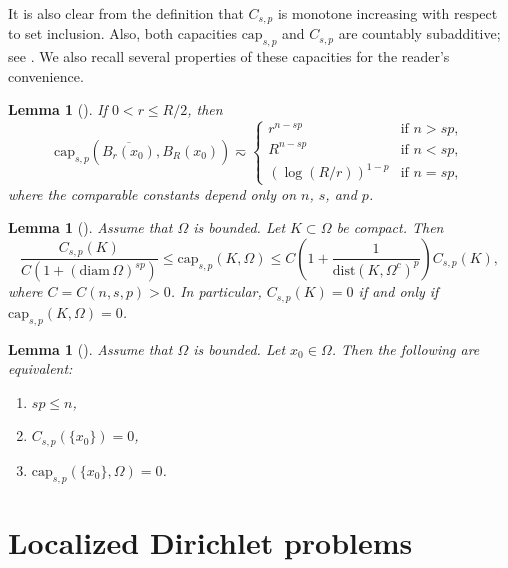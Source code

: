 \documentclass[11pt]{amsart}
\theoremstyle{plain}
\newtheorem{lemma}[theorem]{Lemma}
\theoremstyle{definition}
\numberwithin{equation}{section}
\begin{document}
It is also clear from the definition that $C_{s, p}$ is monotone increasing with respect to set inclusion. Also, both capacities $\mathrm{cap}_{s,p}$ and $C_{s,p}$ are countably subadditive; see \cite[Proposition~3.7]{BBK25}. We also recall several properties of these capacities for the reader's convenience.









\begin{lemma}[{\cite[Lemma~2.17]{KLL23}}]\label{lem-cap}
If $0<r \leq R/2$, then
\begin{equation*}
\mathrm{cap}_{s,p}(\overline{B_r(x_0)}, B_R(x_0)) \eqsim 
\begin{cases}
r^{n-sp}  &\text{if } n>sp, \\
R^{n-sp} &\text{if } n<sp, \\
(\log(R/r))^{1-p}  &\text{if } n=sp,
\end{cases}
\end{equation*}
where the comparable constants depend only on $n$, $s$, and $p$.
\end{lemma}



\begin{lemma}[{\cite[Proposition~5.4]{BBK24}}]
Assume that $\Omega$ is bounded. Let $K \subset \Omega$ be compact. Then
\begin{equation*}
\frac{C_{s, p}(K)}{C(1+(\mathrm{diam}\,\Omega)^{sp})} \leq \mathrm{cap}_{s, p}(K, \Omega) \leq C \left( 1 + \frac{1}{\mathrm{dist}(K, \Omega^c)^p} \right) C_{s, p}(K),
\end{equation*}
where $C=C(n, s, p)>0$. In particular, $C_{s, p}(K)=0$ if and only if $\mathrm{cap}_{s, p}(K, \Omega)=0$.
\end{lemma}


\begin{lemma}[{\cite[Lemma~5.5]{BBK24}}]
Assume that $\Omega$ is bounded. Let $x_0 \in \Omega$. Then the following are equivalent:
\begin{enumerate}
\item
$sp \leq n$,
\item
$C_{s, p}(\{x_0\})=0$,
\item
$\mathrm{cap}_{s, p}(\{x_0\}, \Omega)=0$.
\end{enumerate}
\end{lemma}



\section{Localized Dirichlet problems}\label{sec-3}
\end{document}
